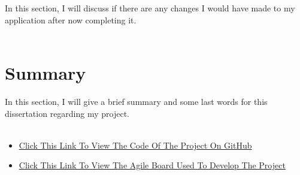 In this section, I will discuss if there are any changes I would have made to my application after now completing it.\\ \\

\section{Summary}

In this section, I will give a brief summary and some last words for this dissertation regarding my project.\\ \\

\begin{appendices}
\begin{itemize}
\item \href{https://github.com/Emmanuel-Osabuehien/AppliedProjectMinorDissertation}{Click This Link To View The Code Of The Project On GitHub}
\item \href{https://g00373559.atlassian.net/jira/software/projects/MPRO/boards/4}{Click This Link To View The Agile Board Used To Develop The Project}
\end{itemize}
\end{appendices}